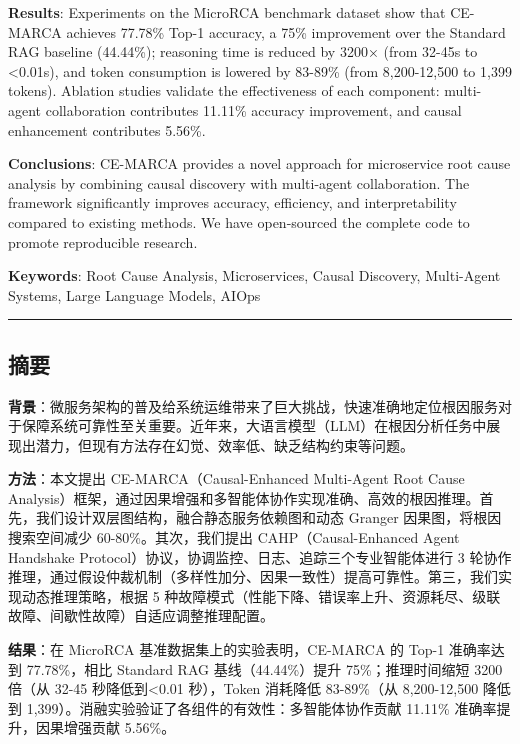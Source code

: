 \textbf{Results}: Experiments on the MicroRCA benchmark dataset show
that CE-MARCA achieves 77.78\% Top-1 accuracy, a 75\% improvement over
the Standard RAG baseline (44.44\%); reasoning time is reduced by 3200×
(from 32-45s to \textless0.01s), and token consumption is lowered by
83-89\% (from 8,200-12,500 to 1,399 tokens). Ablation studies validate
the effectiveness of each component: multi-agent collaboration
contributes 11.11\% accuracy improvement, and causal enhancement
contributes 5.56\%.

\textbf{Conclusions}: CE-MARCA provides a novel approach for
microservice root cause analysis by combining causal discovery with
multi-agent collaboration. The framework significantly improves
accuracy, efficiency, and interpretability compared to existing methods.
We have open-sourced the complete code to promote reproducible research.

\textbf{Keywords}: Root Cause Analysis, Microservices, Causal Discovery,
Multi-Agent Systems, Large Language Models, AIOps

\begin{center}\rule{0.5\linewidth}{0.5pt}\end{center}

\hypertarget{ux6458ux8981}{%
\subsection{摘要}\label{ux6458ux8981}}

\textbf{背景}：微服务架构的普及给系统运维带来了巨大挑战，快速准确地定位根因服务对于保障系统可靠性至关重要。近年来，大语言模型（LLM）在根因分析任务中展现出潜力，但现有方法存在幻觉、效率低、缺乏结构约束等问题。

\textbf{方法}：本文提出 CE-MARCA（Causal-Enhanced Multi-Agent Root Cause
Analysis）框架，通过因果增强和多智能体协作实现准确、高效的根因推理。首先，我们设计双层图结构，融合静态服务依赖图和动态
Granger 因果图，将根因搜索空间减少 60-80\%。其次，我们提出
CAHP（Causal-Enhanced Agent Handshake
Protocol）协议，协调监控、日志、追踪三个专业智能体进行 3
轮协作推理，通过假设仲裁机制（多样性加分、因果一致性）提高可靠性。第三，我们实现动态推理策略，根据
5
种故障模式（性能下降、错误率上升、资源耗尽、级联故障、间歇性故障）自适应调整推理配置。

\textbf{结果}：在 MicroRCA 基准数据集上的实验表明，CE-MARCA 的 Top-1
准确率达到 77.78\%，相比 Standard RAG 基线（44.44\%）提升
75\%；推理时间缩短 3200 倍（从 32-45 秒降低到\textless0.01 秒），Token
消耗降低 83-89\%（从 8,200-12,500 降低到
1,399）。消融实验验证了各组件的有效性：多智能体协作贡献 11.11\%
准确率提升，因果增强贡献 5.56\%。

